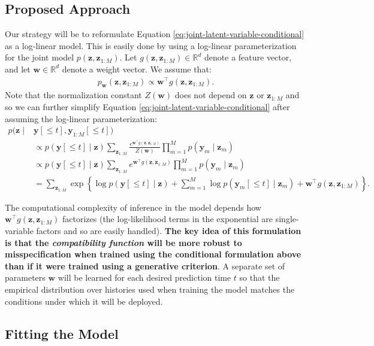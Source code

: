 \documentclass[12pt]{article}
\newcommand{\T}{\top}
\newcommand{\given}{\mid}
\newcommand{\R}{\mathbb{R}}
\begin{document}
\subsection{Proposed Approach}

Our strategy will be to reformulate Equation \ref{eq:joint-latent-variable-conditional} as a log-linear model. This is easily done by using a log-linear parameterization for the joint model $p(\bm{z}, \bm{z}_{1:M})$. Let $g(\bm{z}, \bm{z}_{1:M}) \in \R^d$ denote a feature vector, and let $\bm{w} \in \R^d$ denote a weight vector. We assume that:
\begin{align}
p_{\bm{w}}(\bm{z}, \bm{z}_{1:M}) \propto \bm{w}^\T g(\bm{z}, \bm{z}_{1:M}).
\end{align}
Note that the normalization constant $Z(\bm{w})$ does not depend on $\bm{z}$ or $\bm{z}_{1:M}$ and so we can further simplify Equation \ref{eq:joint-latent-variable-conditional} after assuming the log-linear parameterization:
\begin{align}
p(\bm{z} \given & \bm{y}[\le t], \bm{y}_{1:M}[\le t]) \\
&\propto p(\bm{y}[\le t] \given \bm{z}) \sum_{\bm{z}_{1:M}} \frac{e^{\bm{w}^\T g(\bm{z}, \bm{z}_{1:M})}}{Z(\bm{w})} \prod_{m=1}^M p(\bm{y}_m \given \bm{z}_m) \\
&\propto p(\bm{y}[\le t] \given \bm{z}) \sum_{\bm{z}_{1:M}} e^{\bm{w}^\T g(\bm{z}, \bm{z}_{1:M})} \prod_{m=1}^M p(\bm{y}_m \given \bm{z}_m) \\
&= \sum_{\bm{z}_{1:M}} \exp \left\{ \log p(\bm{y}[\le t] \given \bm{z}) + \sum_{m=1}^M \log p(\bm{y}_m[\le t] \given \bm{z}_m) + \bm{w}^\T g(\bm{z}, \bm{z}_{1:M}) \right\}.
\end{align}

The computational complexity of inference in the model depends how $\bm{w}^\T g(\bm{z}, \bm{z}_{1:M})$ factorizes (the log-likelihood terms in the exponential are single-variable factors and so are easily handled). \textbf{The key idea of this formulation is that the \emph{compatibility function} will be more robust to misspecification when trained using the conditional formulation above than if it were trained using a generative criterion}. A separate set of parameters $\bm{w}$ will be learned for each desired prediction time $t$ so that the empirical distribution over histories used when training the model matches the conditions under which it will be deployed.

\subsection{Fitting the Model}
\end{document}
